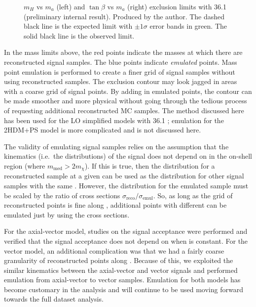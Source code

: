 \begin{figure}[!htb]
\begin{subfigure}[b]{0.48\textwidth}
        \label{fig:limits_2hdma_tan}
    \end{subfigure}
    \caption{$m_H$ vs $m_a$ (left) and $\tan \beta$ vs $m_a$ (right) exclusion limits with 36.1 \ifb (preliminary internal result). Produced by the author. The dashed black line is the expected limit with $\pm 1 \sigma$ error bands in green. The solid black line is the observed limit.}
\label{fig:2hdma}
\end{figure}

In the mass limits above, the red points indicate the masses at which there are reconstructed signal samples. The blue points indicate \textit{emulated} points. Mass point emulation is performed to create a finer grid of signal samples without using reconstructed samples. The exclusion contour may look jagged in areas with a coarse grid of signal points. By adding in emulated points, the contour can be made smoother and more physical without going through the tedious process of requesting additional reconstructed MC samples. The method discussed here has been used for the LO simplified models with 36.1 \ifb; emulation for the 2HDM+PS model is more complicated and is not discussed here. 

The validity of emulating signal samples relies on the assumption that the kinematics (i.e.\ the \etmiss distributions) of the signal does not depend on \mchi in the on-shell region (where $m_\text{med} > 2 m_\chi$). If this is true, then the \etmiss distribution for a reconstructed sample at a given \mmed can be used as the \etmiss distribution for other signal samples with the same \mmed. However, the \etmiss distribution for the emulated sample must be scaled by the ratio of cross sections $\sigma_\text{reco}/\sigma_\text{emul}$. So, as long as the grid of reconstructed points is fine along \mmed, additional points with different \mchi can be emulated just by using the cross sections.

For the axial-vector model, studies on the signal acceptance were performed and verified that the signal acceptance does not depend on \mchi when \mmed is constant. For the vector model, an additional complication was that we had a fairly coarse granularity of reconstructed points along \mmed. Because of this, we exploited the similar kinematics between the axial-vector and vector signals and performed emulation from axial-vector to vector samples. Emulation for both models has become customary in the \monoZ analysis and will continue to be used moving forward towards the full dataset analysis.


